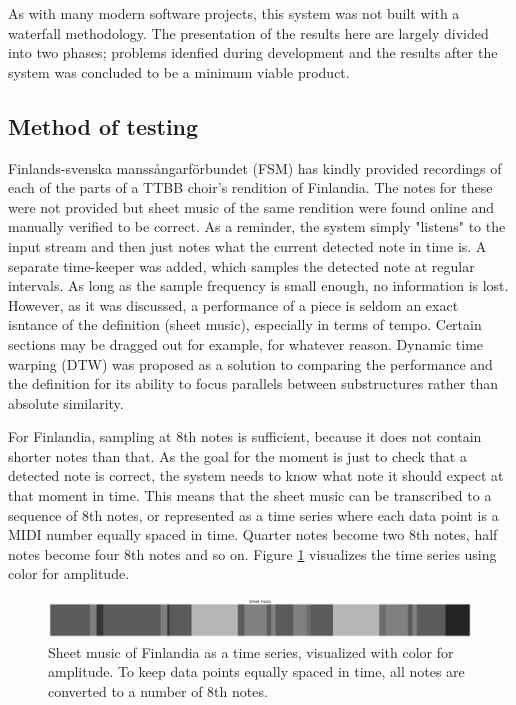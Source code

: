 As with many modern software projects, this system was not built with a waterfall methodology. The presentation of the results here are largely divided into two phases; problems idenfied during development and the results after the system was concluded to be a minimum viable product. 

\subsection{Method of testing}
Finlands-svenska manssångarförbundet (FSM) has kindly provided recordings of each of the parts of a TTBB choir's rendition of Finlandia. The notes for these were not provided but sheet music of the same rendition were found online and manually verified to be correct. As a reminder, the system simply "listens" to the input stream and then just notes what the current detected note in time is. A separate time-keeper was added, which samples the detected note at regular intervals. As long as the sample frequency is small enough, no information is lost. However, as it was discussed, a performance of a piece is seldom an exact isntance of the definition (sheet music), especially in terms of tempo. Certain sections may be dragged out for example, for whatever reason. Dynamic time warping (DTW) was proposed as a solution to comparing the performance and the definition for its ability to focus parallels between substructures rather than absolute similarity.

For Finlandia, sampling at 8th notes is sufficient, because it does not contain shorter notes than that. As the goal for the moment is just to check that a detected note is correct, the system needs to know what note it should expect at that moment in time. This means that the sheet music can be transcribed to a sequence of 8th notes, or represented as a time series where each data point is a MIDI number equally spaced in time. Quarter notes become two 8th notes, half notes become four 8th notes and so on. Figure \ref{fig:sheetEncoding} visualizes the time series using color for amplitude.

\begin{figure}[ht]
    \centering
    \includegraphics[width=\textwidth]{./images/sheetEncoding.png}
    \caption{Sheet music of Finlandia as a time series, visualized with color for amplitude. To keep data points equally spaced in time, all notes are converted to a number of 8th notes. \label{fig:sheetEncoding}}
\end{figure}

